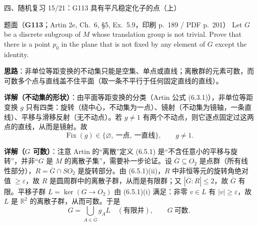 \documentclass[aspectratio=169,10pt,fontset=none]{ctexbeamer}
\newcommand{\ex}[1]{\textcolor{accent}{\footnotesize\bfseries #1}}
\newcommand{\key}[1]{\textcolor{ink}{\bfseries #1}}
\begin{document}

\begin{frame}[t]{四、随机复习 15/21：G113 具有平凡稳定化子的点（上）}
\label{ex:G113}
\scriptsize
\begin{block}{\footnotesize 题面（\ex{G113}；Artin 2e, Ch.~6, §5, Ex.~5.9，印刷 p.~189 / PDF p.~201）}
Let $G$ be a discrete subgroup of $M$ whose translation group is not trivial. Prove that there is a point $p_0$ in the plane that is not fixed by any element of $G$ except the identity.
\end{block}
\key{思路}：非单位等距变换的不动集只能是空集、单点或直线；离散群的元素可数，而可数多个点与直线盖不住平面（取一条不平行于任何固定直线的直线）。

\key{详解（不动集的形状）}：由平面等距变换的分类（Artin 公式 (6.3.1)），非单位等距变换 $g$ 只有四类：旋转（绕中心，不动集为一点）、镜射（不动集为镜轴，一条直线）、平移与滑移反射（无不动点）。若 $g\ne1$ 有两个不动点，则它逐点固定过这两点的直线，从而是镜射。故
\[ \operatorname{Fix}(g)\in\{\varnothing,\ \text{一点},\ \text{一直线}\},\qquad g\ne 1. \]

\key{详解（$G$ 可数）}：注意 Artin 的“离散”定义 (6.5.1) 是“不含任意小的平移与旋转”，并非“$G$ 是 $M$ 的离散子集”，需要补一步论证。设 $\overline G\subseteq O_2$ 是点群（所有线性部分），$R=\overline G\cap SO_2$ 是旋转部分。由 (6.5.1)(ii)，$R$ 中非恒等元的旋转角绝对值 $\ge\varepsilon$，故 $R$ 是圆周群中的离散子群，从而是有限群；又 $|\overline G:R|\le2$，故 $\overline G$ 有限。平移子群 $L=\ker(G\to O_2)$ 由 (6.5.1)(i) 满足：非零 $v\in L$ 有 $|v|\ge\varepsilon$，故 $L$ 是 $\mathbb R^2$ 的离散子群，从而可数。于是
\[ G=\bigcup_{A\in\overline G} g_A L\quad(\text{有限并}),\qquad G\ \text{可数}. \]
\end{frame}
\end{document}
